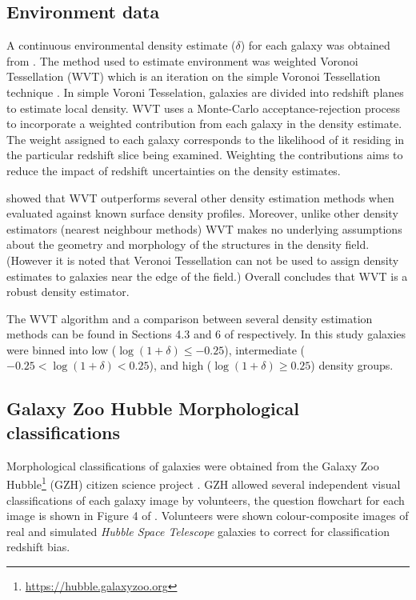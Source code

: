 \documentclass[a4paper,fleqn,usenatbib]{mnras}
\begin{document}
   \subsection{Environment data}
  
   A continuous environmental density estimate ($\delta$) for each galaxy was obtained from \cite{darvish2015}.
   The method used to estimate environment was weighted Voronoi Tessellation (WVT) which is an iteration 
   on the simple Voronoi Tessellation technique \citep{ebeling1993,bernardeau1996}. In simple Voroni 
   Tesselation, galaxies are divided into redshift planes to estimate local density. WVT uses a Monte-Carlo 
   acceptance-rejection process to incorporate a weighted contribution from each galaxy in the density
   estimate. The weight assigned to each galaxy corresponds to the likelihood of it residing in the 
   particular redshift slice being examined. Weighting the contributions aims to reduce the impact of 
   redshift uncertainties on the density estimates.

   \cite{darvish2015} showed that WVT outperforms several other density estimation methods when evaluated 
   against known surface density profiles. Moreover, unlike other density estimators (nearest neighbour methods) 
   WVT makes no underlying assumptions about the geometry and morphology of the structures in the density field. 
   (However it is noted that Veronoi Tessellation can not be used to assign density estimates to galaxies near the
   edge of the field.) Overall \cite{darvish2015} concludes that WVT is a robust density estimator. 

   The WVT algorithm and a comparison between several density estimation methods can be found 
   in Sections 4.3 and 6 of \cite{darvish2015} respectively. In this study galaxies were binned into low
   ($\log(1+\delta)\leq-0.25$), intermediate ($-0.25 <\log(1+\delta)< 0.25$), and high ($\log(1+\delta)\geq0.25$)
   density groups.

   \subsection{Galaxy Zoo Hubble Morphological classifications}
   
   Morphological classifications of galaxies were obtained from the Galaxy Zoo Hubble\footnote{\url{https://hubble.galaxyzoo.org}} (GZH) citizen 
   science project \citep{galaxyzooHubble}. GZH allowed several independent visual classifications of each galaxy image by volunteers, the question flowchart for each
   image is shown in Figure 4 of \cite{galaxyzooHubble}. Volunteers were shown colour-composite images of real and simulated \textit{Hubble Space Telescope} galaxies to
   correct for classification redshift bias. 
\end{document}
